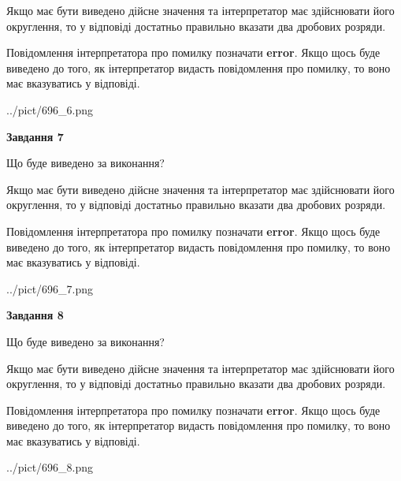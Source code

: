 \documentclass[12pt, ukrainian]{article}
\begin{document}
{\begin {Large}
Якщо має бути виведено дійсне значення та інтерпретатор має здійснювати його округлення, 
то у відповіді достатньо правильно вказати два дробових розряди.

Повідомлення інтерпретатора про помилку позначати \textbf{error}.
Якщо щось буде виведено до того, як інтерпретатор видасть повідомлення про помилку, 
то воно має вказуватись у відповіді. \par

\begin{center}
	{../pict/696_6.png}
\end{center}
\newpage

{\begin {center}\textbf{Завдання 7}\end {center}}\par
Що буде виведено за виконання? \par

Якщо має бути виведено дійсне значення та інтерпретатор має здійснювати його округлення, 
то у відповіді достатньо правильно вказати два дробових розряди.

Повідомлення інтерпретатора про помилку позначати \textbf{error}.
Якщо щось буде виведено до того, як інтерпретатор видасть повідомлення про помилку, 
то воно має вказуватись у відповіді. \par

\begin{center}
	{../pict/696_7.png}
\end{center}
\newpage

{\begin {center}\textbf{Завдання 8}\end {center}}\par
Що буде виведено за виконання? \par

Якщо має бути виведено дійсне значення та інтерпретатор має здійснювати його округлення, 
то у відповіді достатньо правильно вказати два дробових розряди.

Повідомлення інтерпретатора про помилку позначати \textbf{error}.
Якщо щось буде виведено до того, як інтерпретатор видасть повідомлення про помилку, 
то воно має вказуватись у відповіді. \par

\begin{center}
	{../pict/696_8.png}
\end{center}
\newpage


\end{Large}}
\end{document}
